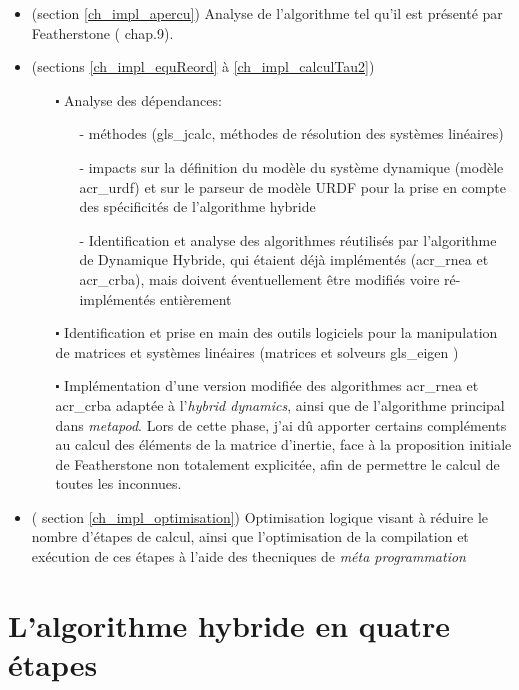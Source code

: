 \documentclass{report}
\begin{document}
\begin{itemize}
\item (section \ref{ch_impl_apercu}) Analyse de l'algorithme tel qu'il est présenté par Featherstone (\cite{bib_featherstone} chap.9).
\item (sections \ref{ch_impl_equReord} à \ref{ch_impl_calculTau2})
  \begin{itemize}
  \item[$\centerdot$] Analyse des dépendances:
  \begin{itemize}
    \item[-] méthodes (\gls{gls_jcalc}, méthodes de résolution des systèmes linéaires)
    \item[-] impacts sur la définition du modèle du système dynamique (modèle \gls{acr_urdf}) et sur le parseur de modèle URDF pour la prise en compte des spécificités de l'algorithme hybride
    \item[-] Identification et analyse des algorithmes réutilisés par l'algorithme de Dynamique Hybride, qui étaient déjà implémentés (\gls{acr_rnea} et \gls{acr_crba}), mais doivent éventuellement être modifiés voire ré-implémentés entièrement
  \end{itemize}
  \item[$\centerdot$] Identification et prise en main des outils logiciels pour la manipulation de matrices et systèmes linéaires (matrices et solveurs \gls{gls_eigen} \cite{bib_eigen_tutorial_alg_lin})
  \item[$\centerdot$] Implémentation d'une version modifiée des algorithmes \gls{acr_rnea} et \gls{acr_crba} adaptée à l'\emph{hybrid dynamics}, ainsi que de l'algorithme principal dans \emph{metapod}. Lors de cette phase, j'ai dû apporter certains compléments au calcul des éléments de la matrice d'inertie, face à la proposition initiale de Featherstone non totalement explicitée, afin de permettre le calcul de toutes les inconnues.
  \end{itemize}
\item ( section \ref{ch_impl_optimisation}) Optimisation logique visant à réduire le nombre d'étapes de calcul, ainsi que l'optimisation de la compilation et exécution de ces étapes à l'aide des thecniques de \emph{méta programmation}
\end{itemize}


\section{L'algorithme hybride en quatre étapes}
\end{document}
